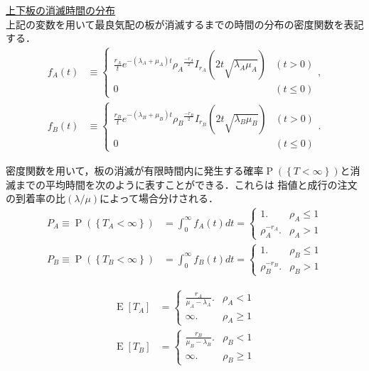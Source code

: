 \documentclass[a4j,papersize,disablejfam,slide,14pt]{jsarticle}
\def\Exp#1{\operatorname{E} \left[ #1 \right]} %
\def\exp#1{e^{#1}} %
\def\prob#1{\operatorname{P} \left(\left\{ #1 \right\}\right)} %
\begin{document}
    
\underline{\large 上下板の消滅時間の分布}\\
    上記の変数を用いて最良気配の板が消滅するまでの時間の分布の密度関数を表記する．
    \begin{align}
    	f_A(t) &\equiv 
        \begin{cases}
        		\frac{r_A}{t} \exp{-(\lambda_A + \mu_A)t} {\rho_A}^{\frac{-r_A}{2}} I_{r_A}(2t\sqrt{\lambda_A \mu_A}) & (t > 0) \\
            	0 & (t \leq 0)
        \end{cases},\\
        f_B(t) &\equiv 
        \begin{cases}
        		\frac{r_B}{t} \exp{-(\lambda_B + \mu_B)t} {\rho_B}^{\frac{-r_B}{2}} I_{r_B}(2t\sqrt{\lambda_B \mu_B}) & (t > 0) \\
            	0 & (t \leq 0)
        \end{cases}.
    \end{align}
    
    密度関数を用いて，板の消滅が有限時間内に発生する確率$\prob{T < \infty}$と消滅までの平均時間を次のように表すことができる．これらは
    指値と成行の注文の到着率の比$(\lambda/\mu)$によって場合分けされる．
    \begin{align}
    	P_A \equiv \prob{T_A < \infty} &= \int_{0}^{\infty} f_A(t) dt =
        \begin{cases}
        	1. & \rho_A \leq 1  \\
            \rho_A^{-r_A}. & \rho_A > 1
        \end{cases} \\
        P_B \equiv \prob{T_B < \infty} &= \int_{0}^{\infty} f_B(t) dt =
        \begin{cases}
        	1. & \rho_B \leq 1  \\
            \rho_B^{-r_B}. & \rho_B > 1
        \end{cases}
    \end{align}
    
    \begin{align}
    	\Exp{T_A} &= \begin{cases}
        	\frac{r_A}{\mu_A - \lambda_A}. & \rho_A < 1 \\
        	\infty. & \rho_A \geq 1
        \end{cases}\\
        \Exp{T_B} &= \begin{cases}
        	\frac{r_B}{\mu_B - \lambda_B}. & \rho_B < 1 \\
        	\infty. & \rho_B \geq 1
        \end{cases}
    \end{align}
    
\end{document}
